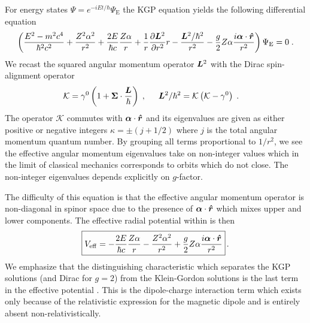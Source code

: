 For energy states $\Psi=e^{-iEt/\hbar}\Psi_\mathrm{E}$ the KGP equation yields the following differential equation
\begin{alignat}{1}
	\label{cou02} \left(\frac{E^{2}-m^{2}c^{4}}{\hbar^{2}c^{2}}+\frac{Z^{2}\alpha^{2}}{r^{2}}+\frac{2E}{\hbar c}\frac{Z\alpha}{r}+\frac{1}{r}\frac{\partial\boldsymbol{L}^{2}}{\partial r^{2}}r-\frac{\boldsymbol{L}^{2}/\hbar^{2}}{r^{2}}-\frac{g}{2}Z\alpha\frac{i\boldsymbol{\alpha}\cdot\boldsymbol{\hat{r}}}{r^{2}}\right)\Psi_\mathrm{E}=0\;.
\end{alignat}
We recast the squared angular momentum operator $\boldsymbol{L}^{2}$ with the Dirac spin-alignment operator
\begin{alignat}{1}
\label{cou04} &\mathcal{K}=\gamma^{0}\left(1+\bb{\Sigma}\cdot\frac{\bb{L}}{\hbar}\right)\;,\indent \bb{L}^{2}/\hbar^{2}=\mathcal{K}\left(\mathcal{K}-\gamma^{0}\right)\;.
\end{alignat}
The operator $\mathcal{K}$ commutes with $\boldsymbol{\alpha}\cdot\boldsymbol{\hat{r}}$ and its eigenvalues are given as either positive or negative integers $\kappa=\pm(j+1/2)$ where $j$ is the total angular momentum quantum number. By grouping all terms proportional to $1/r^{2}$, we see the effective angular momentum eigenvalues take on non-integer values which in the limit of classical mechanics corresponds to orbits which do not close. The non-integer eigenvalues depends explicitly on $g$-factor.

The difficulty of this equation is that the effective angular momentum operator is non-diagonal in spinor space due to the presence of $\boldsymbol{\alpha}\cdot\boldsymbol{\hat{r}}$ which mixes upper and lower components. The effective radial potential within  is then
\begin{alignat}{1}
	\label{temp} \boxed{V_\mathrm{eff}=-\frac{2E}{\hbar c}\frac{Z\alpha}{r}-\frac{Z^{2}\alpha^{2}}{r^{2}}+\frac{g}{2}Z\alpha\frac{i\boldsymbol{\alpha}\cdot\boldsymbol{\hat{r}}}{r^{2}}}\,.
\end{alignat}
We emphasize that the distinguishing characteristic which separates the KGP solutions (and Dirac for $g\!=\!2$) from the Klein-Gordon solutions is the last term in the effective potential . This is the dipole-charge interaction term which exists only because of the relativistic expression for the magnetic dipole and is entirely absent non-relativistically. 

